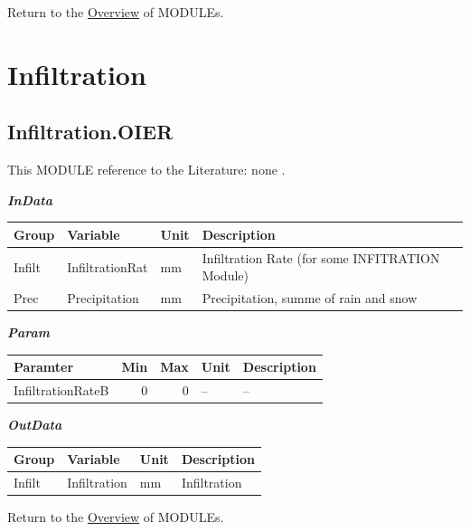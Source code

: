 \documentclass[
]{book}
\begin{document}
Return to the \protect\hyperlink{module}{Overview} of MODULEs.

\hypertarget{Infiltration}{%
\section{Infiltration}\label{Infiltration}}

\hypertarget{Infiltration.OIER}{%
\subsection{Infiltration.OIER}\label{Infiltration.OIER}}

This MODULE reference to the Literature: none \citep{none}.

\textbf{\emph{InData}}

\begin{table}[!h]
\centering
\begin{tabular}{l|l|l|l}
\hline
Group & Variable & Unit & Description\\
\hline
Infilt & InfiltrationRat & mm & Infiltration Rate (for some INFITRATION Module)\\
\cline{1-4}
Prec & Precipitation & mm & Precipitation, summe of rain and snow\\
\hline
\end{tabular}
\end{table}

\textbf{\emph{Param}}

\begin{table}[!h]
\centering
\begin{tabular}{l|r|r|l|l}
\hline
Paramter & Min & Max & Unit & Description\\
\hline
InfiltrationRateB & 0 & 0 & -- & --\\
\hline
\end{tabular}
\end{table}

\textbf{\emph{OutData}}

\begin{table}[!h]
\centering
\begin{tabular}{l|l|l|l}
\hline
Group & Variable & Unit & Description\\
\hline
Infilt & Infiltration & mm & Infiltration\\
\hline
\end{tabular}
\end{table}

Return to the \protect\hyperlink{module}{Overview} of MODULEs.
\end{document}
